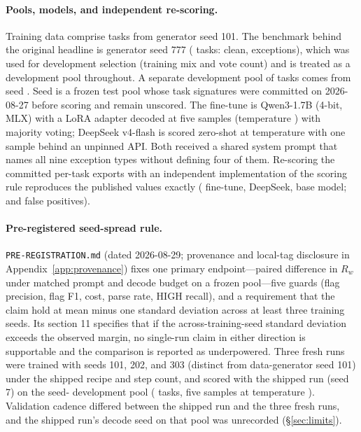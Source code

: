 \documentclass[11pt]{article}
\begin{document}
\paragraph{Pools, models, and independent re-scoring.} Training data comprise \nTrain{} tasks from generator seed 101. The benchmark behind the original headline is generator seed 777 (\nBench{} tasks: \nClean{} clean, \nExc{} exceptions), which was used for development selection (training mix and vote count) and is treated as a development pool throughout. A separate development pool of \nPoolTasks{} tasks comes from seed \devPoolSeed{}. Seed \frozenSeed{} is a frozen test pool whose \nFrozen{} task signatures were committed on 2026-08-27 before scoring and remain unscored. The fine-tune is Qwen3-1.7B (4-bit, MLX) with a LoRA adapter decoded at five samples (temperature \tempChamp{}) with majority voting; DeepSeek v4-flash is scored zero-shot at temperature \tempDS{} with one sample behind an unpinned API. Both received a shared system prompt that names all nine exception types without defining four of them. Re-scoring the committed per-task exports with an independent implementation of the scoring rule reproduces the published values exactly (\rescoredChamp{} fine-tune, \rescoredDS{} DeepSeek, \rescoredBase{} base model; \rescoredFP{} and \rescoredFPds{} false positives).

\paragraph{Pre-registered seed-spread rule.} \texttt{PRE-REGISTRATION.md} (dated 2026-08-29; provenance and local-tag disclosure in Appendix~\ref{app:provenance}) fixes one primary endpoint---paired difference in $R_w$ under matched prompt and decode budget on a frozen pool---five guards (flag precision, flag F1, cost, parse rate, HIGH recall), and a requirement that the claim hold at mean minus one standard deviation across at least three training seeds. Its section 11 specifies that if the across-training-seed standard deviation exceeds the observed margin, no single-run claim in either direction is supportable and the comparison is reported as underpowered. Three fresh runs were trained with seeds 101, 202, and 303 (distinct from data-generator seed 101) under the shipped recipe and step count, and scored with the shipped run (seed 7) on the seed-\devPoolSeed{} development pool (\nPoolTasks{} tasks, five samples at temperature \decodeTemp{}). Validation cadence differed between the shipped run and the three fresh runs, and the shipped run's decode seed on that pool was unrecorded (\S\ref{sec:limits}).
\end{document}
